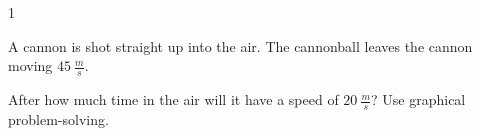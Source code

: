 
\AddToShipoutPicture*{\BackgroundPic}

\addtocounter {ProbNum} {1}

 
{\bf \Large{}} A cannon is shot straight up into the air. The cannonball leaves the cannon moving ${45~\tfrac{m}{s}}$.  

\bigskip  After how much time in the air will it have a speed of ${20~\tfrac{m}{s}}$? Use graphical problem-solving.



\vfill
\newpage